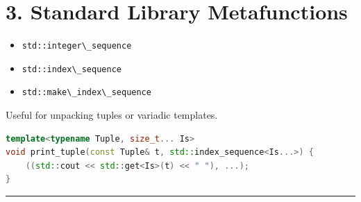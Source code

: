 \hypertarget{standard-library-metafunctions}{%
\section{3. Standard Library
Metafunctions}\label{standard-library-metafunctions}}

\begin{itemize}
\tightlist
\item
  \passthrough{\lstinline!std::integer\_sequence!}
\item
  \passthrough{\lstinline!std::index\_sequence!}
\item
  \passthrough{\lstinline!std::make\_index\_sequence!}
\end{itemize}

Useful for unpacking tuples or variadic templates.

\begin{lstlisting}[language={C++}]
template<typename Tuple, size_t... Is>
void print_tuple(const Tuple& t, std::index_sequence<Is...>) {
    ((std::cout << std::get<Is>(t) << " "), ...);
}
\end{lstlisting}

\begin{center}\rule{0.5\linewidth}{0.5pt}\end{center}
